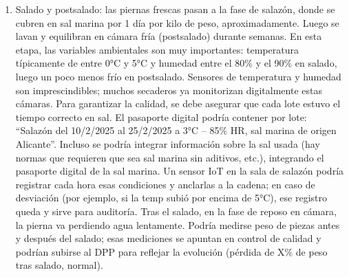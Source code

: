 \begin{enumerate}
    \item Salado y postsalado: las piernas frescas pasan a la fase de salazón, donde se cubren en sal marina por 1 día por kilo de peso, aproximadamente. Luego se lavan y equilibran en cámara fría (postsalado) durante semanas. En esta etapa, las variables ambientales son muy importantes: temperatura típicamente de entre 0°C y 5°C y humedad entre el 80\% y el 90\% en salado, luego un poco menos frío en postsalado. Sensores de temperatura y humedad son imprescindibles; muchos secaderos ya monitorizan digitalmente estas cámaras. Para garantizar la calidad, se debe asegurar que cada lote estuvo el tiempo correcto en sal. El pasaporte digital podría contener por lote: “Salazón del 10/2/2025 al 25/2/2025 a 3°C – 85\% HR, sal marina de origen Alicante”. Incluso se podría integrar información sobre la sal usada (hay normas que requieren que sea sal marina sin aditivos, etc.), integrando el pasaporte digital de la sal marina. Un sensor IoT en la sala de salazón podría registrar cada hora esas condiciones y anclarlas a la cadena; en caso de desviación (por ejemplo, si la temp subió por encima de 5°C), ese registro queda y sirve para auditoría. Tras el salado, en la fase de reposo en cámara, la pierna va perdiendo agua lentamente. Podría medirse peso de piezas antes y después del salado; esas mediciones se apuntan en control de calidad y podrían subirse al DPP para reflejar la evolución (pérdida de X\% de peso tras salado, normal).

\end{enumerate}
